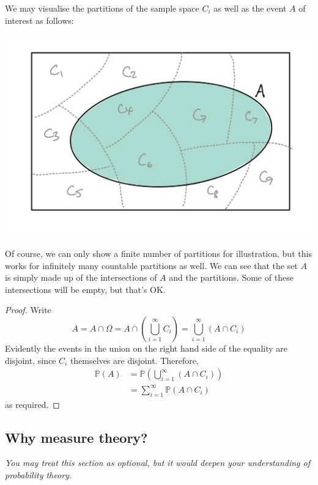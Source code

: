 \documentclass[
]{book}
\newcommand{\bbP}{\mathbb{P}}
\theoremstyle{definition}
\theoremstyle{definition}
\theoremstyle{definition}
\theoremstyle{definition}
\theoremstyle{remark}
\begin{document}
We may visualise the partitions of the sample space \(C_i\) as well as the event \(A\) of interest as follows:

\begin{center}\includegraphics[width=0.8\linewidth]{figure/lawoftotalprob} \end{center}

Of course, we can only show a finite number of partitions for illustration, but this works for infinitely many countable partitions as well. We can see that the set \(A\) is simply made up of the intersections of \(A\) and the partitions.
Some of these intersections will be empty, but that's OK.

\begin{proof}
Write
\[
A = A \cap \Omega = A \cap \left(\bigcup_{i=1}^\infty C_i\right) = \bigcup_{i=1}^\infty(A \cap C_i)
\]
Evidently the events in the union on the right hand side of the equality are disjoint, since \(C_i\) themselves are disjoint.
Therefore,
\begin{align*}
\bbP(A) 
&= \bbP\left(\bigcup_{i=1}^\infty(A \cap C_i) \right) \\
&= \sum_{i=1}^\infty \bbP(A \cap C_i)
\end{align*}
as required.
\end{proof}

\hypertarget{why-measure-theory}{%
\subsection{Why measure theory?}\label{why-measure-theory}}

\emph{You may treat this section as optional, but it would deepen your understanding of probability theory.}
\end{document}
